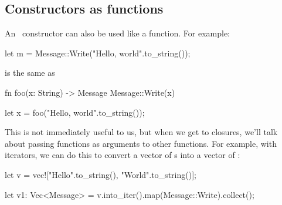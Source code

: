 \subsection*{Constructors as functions}

An \enum\ constructor can also be used like a function. For example:

\begin{rustc}
let m = Message::Write("Hello, world".to_string());
\end{rustc}

is the same as

\begin{rustc}
fn foo(x: String) -> Message {
    Message::Write(x)
}

let x = foo("Hello, world".to_string());
\end{rustc}

This is not immediately useful to us, but when we get to closures, we'll talk about passing functions as arguments to other functions. 
For example, with iterators, we can do this to convert a vector of \String s into a vector of :

\begin{rustc}
let v = vec!["Hello".to_string(), "World".to_string()];

let v1: Vec<Message> = v.into_iter().map(Message::Write).collect();
\end{rustc}
